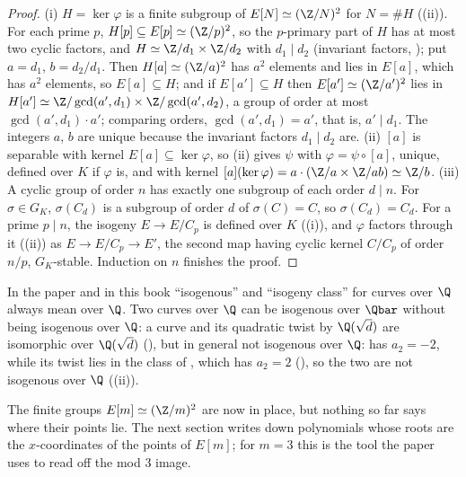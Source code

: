 \begin{proof}
(i) $H=\ker\varphi$ is a finite subgroup of $E[N]\simeq(\Z/N)^2$ for $N=\#H$ ((ii)). For each prime $p$, $H[p]\subseteq E[p]\simeq(\Z/p)^2$,
so the $p$-primary part of $H$ has at most two cyclic factors, and $H\simeq\Z/d_1\times\Z/d_2$ with $d_1\mid d_2$ (invariant factors, ); put $a=d_1$,
$b=d_2/d_1$. Then $H[a]\simeq(\Z/a)^2$ has $a^2$ elements and lies in $E[a]$, which has $a^2$ elements, so $E[a]\subseteq H$; and if $E[a']\subseteq H$ then
$E[a']\simeq(\Z/a')^2$ lies in $H[a']\simeq\Z/\gcd(a',d_1)\times\Z/\gcd(a',d_2)$, a group of order at most $\gcd(a',d_1)\cdot a'$; comparing orders,
$\gcd(a',d_1)=a'$, that is, $a'\mid d_1$. The integers $a$, $b$ are unique because the invariant factors $d_1\mid d_2$ are.
(ii) $[a]$ is separable with kernel $E[a]\subseteq\ker\varphi$, so (ii) gives $\psi$ with $\varphi=\psi\circ[a]$, unique, defined over $K$ if
$\varphi$ is, and with kernel $[a](\ker\varphi)=a\cdot(\Z/a\times\Z/ab)\simeq\Z/b$.
(iii) A cyclic group of order $n$ has exactly one subgroup of each order $d\mid n$. For $\sigma\in G_K$, $\sigma(C_d)$ is a subgroup of order $d$ of $\sigma(C)=C$, so
$\sigma(C_d)=C_d$. For a prime $p\mid n$, the isogeny $E\to E/C_p$ is defined over $K$ ((i)), and $\varphi$ factors through it
((ii)) as $E\to E/C_p\to E'$, the second map having cyclic kernel $C/C_p$ of order $n/p$, $G_K$-stable. Induction on $n$ finishes the proof.
\end{proof}

\begin{warning}\label{warn:ellcurves:isogenous}
In the paper and in this book ``isogenous'' and ``isogeny class'' for curves over $\Q$ always mean over $\Q$. Two curves over $\Q$ can be isogenous over
$\Qbar$ without being isogenous over $\Q$: a curve and its quadratic twist by $\Q(\sqrt d)$ are isomorphic over $\Q(\sqrt d)$
(), but in general not isogenous over $\Q$:  has $a_2=-2$, while its twist  lies in the class of , which has
$a_2=2$ (), so the two are not isogenous over $\Q$ ((ii)).
\end{warning}

\noindent The finite groups $E[m]\simeq(\Z/m)^2$ are now in place, but nothing so far says where their points lie. The next section writes down polynomials whose roots are the
$x$-coordinates of the points of $E[m]$; for $m=3$ this is the tool the paper uses to read off the mod $3$ image.

